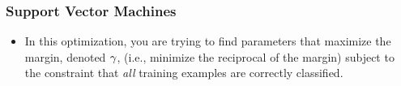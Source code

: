 \documentclass[trans]{beamer}
\begin{document}
\begin{frame}
  \frametitle{Support Vector Machines}
\begin{itemize}
\item 
In this optimization, you are trying to find parameters that maximize
the margin, denoted $\gamma$, (i.e., minimize the reciprocal of the
margin) subject to the constraint that \emph{all} training examples
are correctly classified.
\end{itemize}
\end{frame}

\end{document}
